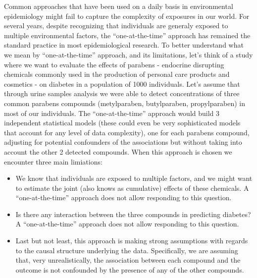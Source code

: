\documentclass[
]{book}
\begin{document}
Common approaches that have been used on a daily basis in environmental epidemiology might fail to capture the complexity of exposures in our world. For several years, despite recognizing that individuals are generaly exposed to multiple environmental factors, the ``one-at-the-time'' approach has remained the standard practice in most epidemiological research. To better understand what we mean by ``one-at-the-time'' approach, and its limitations, let's think of a study where we want to evaluate the effects of parabens - endocrine disrupting chemicals commonly used in the production of personal care products and cosmetics - on diabetes in a population of 1000 individuals. Let's assume that through urine samples analysis we were able to detect concentrations of three common parabens compounds (metylparaben, butylparaben, propylparaben) in most of our individuals. The ``one-at-the-time'' approach would build 3 independent statistical models (these could even be very sophisticated models that account for any level of data complexity), one for each parabens compound, adjusting for potential confounders of the associations but without taking into account the other 2 detected compounds. When this approach is chosen we encounter three main limiations:

\begin{itemize}
\item
  We know that individuals are exposed to multiple factors, and we might want to estimate the joint (also knows as cumulative) effects of these chemicals. A ``one-at-the-time'' approach does not allow responding to this question.
\item
  Is there any interaction between the three compounds in predicting diabetes? A ``one-at-the-time'' approach does not allow responding to this question.
\item
  Last but not least, this approach is making strong assumptions with regards to the causal structure underlying the data. Specifically, we are assuming that, very unrealistically, the association between each compound and the outcome is not confounded by the presence of any of the other compounds.
\end{itemize}
\end{document}
